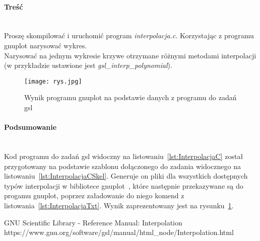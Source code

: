 \paragraph{Treść}~\\
Proszę skompilować i uruchomić program \textit{interpolacja.c}.
Korzystając z programu gnuplot narysować wykres.\\
Narysować na jednym wykresie krzywe otrzymane różnymi metodami interpolacji (w przykładzie ustawione jest \textit{gsl\_interp\_polynomial}).







\begin{figure}[p]
  \caption{Wynik programu gnuplot na podstawie danych z programu do zadań gsl}
  \label{fig:RysJpg}
  \centering
  \texttt{[image: rys.jpg]}
\end{figure}

\paragraph{Podsumowanie}~\\
Kod programu do zadań gsl widoczny na listowaniu~\ref{lst:InterpolacjaC} został przygotowany na podstawie szablonu dołączonego do zadania widocznego na listowaniu~\ref{lst:InterpolacjaCSkel}.
Generuje on pliki dla wszystkich dostępnych typów interpolacji w bibliotece gnuplot~\cite{GslManualInterpolation}, które następnie przekazywane są do progamu gnuplot, poprzez załadowanie do niego komend z listowania~\ref{lst:InterpolacjaTxt}.
Wynik zaprezentowany jest na rysunku~\ref{fig:RysJpg}.

\begin{thebibliography}{9}
   GNU Scientific Library - Reference Manual: Interpolation https://www.gnu.org/software/gsl/manual/html\_node/Interpolation.html
\end{thebibliography}
